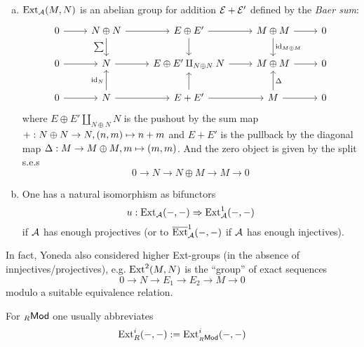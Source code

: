 \documentclass[a4paper]{report}
\begin{document}
\begin{prop}
\begin{enumerate}[(a)]
  \item $\operatorname{Ext}_{\mathcal{A}}(M,N)$ is an abelian group for addition $\cal E + E'$ defined by the \emph{Baer sum}:
        \[\begin{tikzcd}
0 \arrow[r] & N \oplus N \arrow[r] \arrow[d, "\sum"']         & E \oplus E' \arrow[r] \arrow[d]     & M \oplus M \arrow[r] \arrow[d, "\mathrm{id}_{M \oplus M}"] & 0 \\
0 \arrow[r] & N \arrow[r]                            & E \oplus E' \amalg_{N \oplus N} N \arrow[r]            & M \oplus M \arrow[r]                                       & 0 \\
0 \arrow[r] & N \arrow[r] \arrow[u, "\mathrm{id}_N"] & E+E' \arrow[r] \arrow[u] & M \arrow[r] \arrow[u, "\Delta"']                  & 0
\end{tikzcd}\]
        where $E \oplus E' \amalg_{N \oplus N} N$ is the pushout by the sum map $+: N \oplus N \to N, (n,m) \mapsto n+m$ and $E+E'$ is the pullback by the diagonal map $\Delta: M \to M \oplus M, m \mapsto (m,m)$.
        And the zero object is given by the split s.e.s \[0 \to N \to N \oplus M \to M \to 0\]
        \item One has a natural isomorphism as bifunctors \[u: \operatorname{Ext}_{\mathcal{A}}(-,-) \Rightarrow \operatorname{Ext}_{\mathcal{A}}^{1}(-,-)\]if $\mathcal{A}$ has enough projectives (or to $\overline {\operatorname{Ext}}_{\mathcal{A}}^{1}(-,-)$ if $\mathcal{A}$ has enough injectives).
\end{enumerate}
\end{prop}

\begin{rem*}
In fact, Yoneda also considered higher Ext-groups (in the absence of innjectives/projectives), e.g. $\operatorname{Ext}^{2}(M,N)$  is the ``group'' of exact sequences \[0 \to N \to E_{1} \to E_{2} \to M \to 0\]modulo a suitable equivalence relation.
\end{rem*}

\begin{nota*}
For ${}_R\mathsf{Mod}$ one usually abbreviates \[\operatorname{Ext}_{R}^{i}(-,-) := \operatorname{Ext}^{i}_{{}_R\mathsf{Mod}}(-,-)\]
\end{nota*}
\end{document}
